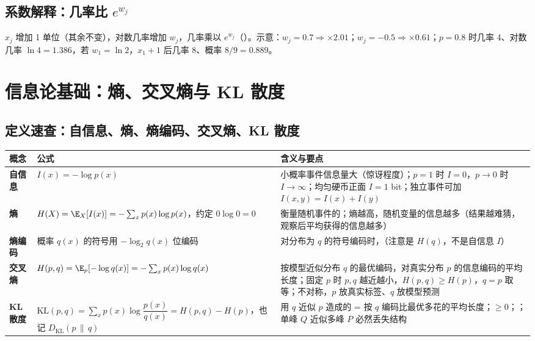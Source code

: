 \subsection{系数解释：几率比 \texorpdfstring{$e^{w_j}$}{exp(w_j)}}
$x_j$ 增加 1 单位（其余不变），对数几率增加 $w_j$，几率乘以 $e^{w_j}$（）。示意：$w_j=0.7\Rightarrow\times2.01$；$w_j=-0.5\Rightarrow\times0.61$；$p=0.8$ 时几率 4、对数几率 $\ln4=1.386$，若 $w_1=\ln2$，$x_1+1$ 后几率 8、概率 $8/9=0.889$。

\section{信息论基础：熵、交叉熵与 KL 散度}

\subsection{定义速查：自信息、熵、熵编码、交叉熵、KL 散度}
\begin{center}\small
\begin{tabularx}{\linewidth}{@{}>{\raggedright\arraybackslash}p{2.1cm}>{\raggedright\arraybackslash}p{5.2cm}L@{}}
\toprule
概念 & 公式 & 含义与要点 \\
\midrule
\textbf{自信息} & $I(x)=-\log p(x)$ & 小概率事件信息量大（惊讶程度）；$p=1$ 时 $I=0$，$p\to0$ 时 $I\to\infty$；均匀硬币正面 $I=1$ bit；独立事件可加 $I(x,y)=I(x)+I(y)$ \\
\textbf{熵} & $H(X)=\E_X[I(x)]=-\sum_x p(x)\log p(x)$，约定 $0\log0=0$ & 衡量随机事件的；熵越高，随机变量的信息越多（结果越难猜，观察后平均获得的信息越多）\\
\textbf{熵编码} & 概率 $q(x)$ 的符号用 $-\log_2 q(x)$ 位编码 & 对分布为 $q$ 的符号编码时，（注意是 $H(q)$，不是自信息 $I$）\\
\textbf{交叉熵} & $H(p,q)=\E_p[-\log q(x)]=-\sum_x p(x)\log q(x)$ & 按模型近似分布 $q$ 的最优编码，对真实分布 $p$ 的信息编码的平均长度；固定 $p$ 时 $p,q$ 越近越小，$H(p,q)\ge H(p)$，$q=p$ 取等；不对称，$p$ 放真实标签、$q$ 放模型预测 \\
\textbf{KL 散度} & $\mathrm{KL}(p,q)=\sum_x p(x)\log\dfrac{p(x)}{q(x)}=H(p,q)-H(p)$，也记 $D_{\mathrm{KL}}(p\,\|\,q)$ & 用 $q$ 近似 $p$ 造成的 = 按 $q$ 编码比最优多花的平均长度；$\ge0$；；单峰 $Q$ 近似多峰 $P$ 必然丢失结构 \\
\bottomrule
\end{tabularx}
\end{center}
